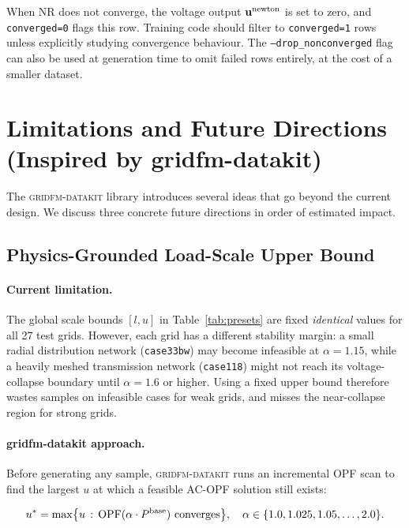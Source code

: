 \documentclass{article}
\begin{document}
When NR does not converge, the voltage output $\mathbf{u}^{\rm newton}$ is
set to zero, and \texttt{converged=0} flags this row.  Training code should
filter to \texttt{converged=1} rows unless explicitly studying convergence
behaviour.  The \texttt{--drop\_nonconverged} flag can also be used at
generation time to omit failed rows entirely, at the cost of a smaller dataset.

\section{Limitations and Future Directions (Inspired by gridfm-datakit)}

The \textsc{gridfm-datakit} library \cite{gridfm2024} introduces several
ideas that go beyond the current design.  We discuss three concrete future
directions in order of estimated impact.

\subsection{Physics-Grounded Load-Scale Upper Bound}

\paragraph{Current limitation.}
The global scale bounds $[l, u]$ in Table~\ref{tab:presets} are fixed
\emph{identical} values for all 27 test grids.  However, each grid has a
different stability margin: a small radial distribution network
(\texttt{case33bw}) may become infeasible at $\alpha = 1.15$, while a
heavily meshed transmission network (\texttt{case118}) might not reach its
voltage-collapse boundary until $\alpha = 1.6$ or higher.  Using a fixed
upper bound therefore wastes samples on infeasible cases for weak grids,
and misses the near-collapse region for strong grids.

\paragraph{gridfm-datakit approach.}
Before generating any sample, \textsc{gridfm-datakit} runs an incremental OPF
scan to find the largest $u$ at which a feasible AC-OPF solution still exists:

\begin{equation}
  u^* = \max\bigl\{ u \,:\, \mathrm{OPF}(\alpha \cdot P^{\rm base}) \text{ converges}\bigr\},
  \quad \alpha \in \{1.0, 1.025, 1.05, \ldots, 2.0\}.
  \label{eq:opf_scan}
\end{equation}
\end{document}
